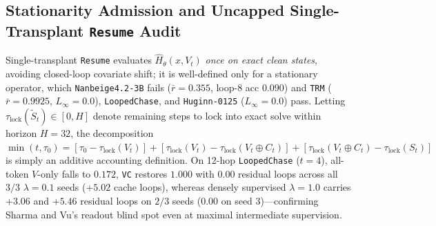 \documentclass[10pt,letterpaper]{article}
\begin{document}
\subsection{Stationarity Admission and Uncapped Single-Transplant \texttt{Resume} Audit}

Single-transplant \texttt{Resume} evaluates $\hat{H}_\theta(x,V_t)$ \emph{once on exact clean states}, avoiding closed-loop covariate shift; it is well-defined only for a stationary operator, which \texttt{Nanbeige4.2-3B} fails ($\bar{r}=0.355$, loop-8 acc $0.090$) and \texttt{TRM} ($\bar{r}=0.9925$, $L_\infty=0.0$), \texttt{LoopedChase}, and \texttt{Huginn-0125} ($L_\infty=0.0$) pass. Letting $\tau_{\mathrm{lock}}(\tilde{S}_t) \in [0, H]$ denote remaining steps to lock into exact solve within horizon $H=32$, the decomposition $\min(t,\tau_0) = [\tau_0 - \tau_{\mathrm{lock}}(V_t)] + [\tau_{\mathrm{lock}}(V_t) - \tau_{\mathrm{lock}}(V_t \oplus C_t)] + [\tau_{\mathrm{lock}}(V_t \oplus C_t) - \tau_{\mathrm{lock}}(S_t)]$ is simply an additive accounting definition. On 12-hop \texttt{LoopedChase} ($t=4$), all-token $V$-only falls to $0.172$, \texttt{VC} restores $1.000$ with $0.00$ residual loops across all $3/3$ $\lambda=0.1$ seeds ($+5.02$ cache loops), whereas densely supervised $\lambda=1.0$ carries $+3.06$ and $+5.46$ residual loops on $2/3$ seeds ($0.00$ on seed 3)—confirming Sharma and Vu's \cite{sharma2026dense} readout blind spot even at maximal intermediate supervision.
\end{document}
